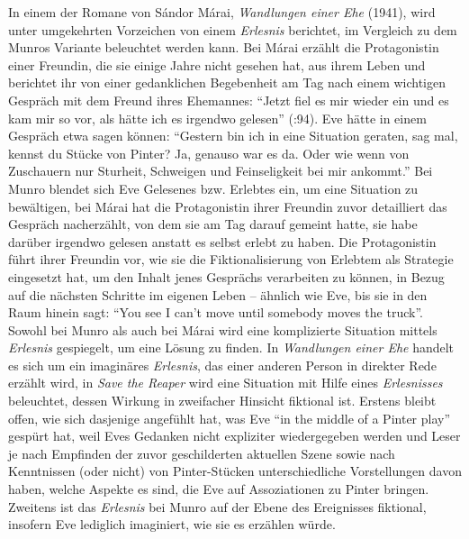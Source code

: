 \documentclass[fontsize=12pt]{scrartcl}
\begin{document}
In einem der Romane von S\'{a}ndor M\'{a}rai, \textit{Wandlungen einer Ehe} (1941), wird unter umgekehrten Vorzeichen von einem \textit{Erlesnis} berichtet, im Vergleich zu dem Munros Variante beleuchtet werden kann. Bei M\'{a}rai erz\"ahlt die Protagonistin\textsuperscript{\tiny *} einer Freun\-din, die sie einige Jahre nicht gesehen hat, aus ihrem Leben und berichtet ihr von einer gedanklichen Begebenheit am Tag nach einem wichtigen Gespr\"ach mit dem Freund ihres Ehemannes: "`Jetzt fiel es mir wieder ein und es kam mir so vor, als h\"atte ich es irgendwo gelesen"' (\cite{Marai1941}:94). Eve h\"atte in einem Gespr\"ach etwa sagen k\"onnen: "`Gestern bin ich in eine Situation geraten, sag mal, kennst du St\"ucke von Pinter? Ja, genauso war es da. Oder wie wenn von Zuschauern nur Sturheit, Schweigen und Feinseligkeit bei mir ankommt."' Bei Munro blendet sich Eve Gelesenes bzw. Erlebtes ein, um eine Si\-tu\-a\-tion zu bew\"altigen, bei M\'{a}rai hat die Protagonistin\textsuperscript{\tiny *} ihrer Freundin zuvor detailliert das Gespr\"ach nacherz\"ahlt, von dem sie am Tag darauf gemeint hatte, sie habe dar\"uber irgendwo gelesen anstatt es \mbox{selbst} erlebt zu haben. Die Protagonistin\textsuperscript{\tiny *} f\"uhrt ihrer Freundin vor, wie sie die Fiktionalisierung von Erlebtem als Strategie eingesetzt hat, um den Inhalt jenes Gespr\"achs verarbei\-ten zu k\"onnen, in Bezug auf die n\"achsten Schritte im eigenen Leben -- \"ahnlich wie Eve, bis sie in den Raum hinein sagt: "`You see I can't move until somebody moves the truck"'. Sowohl bei Munro als auch bei M\'{a}rai wird eine komplizierte Situation mittels \textit{Erlesnis} gespiegelt, um eine L\"osung zu fin\-den. In \textit{Wandlungen einer Ehe} handelt es sich um ein imagin\"ares \textit{Erlesnis}, das einer anderen Person in direkter Rede erz\"ahlt wird, in \textit{Save the Reaper} wird eine Situation mit Hilfe eines \textit{Erlesnisses} beleuchtet, dessen Wirkung in zweifacher Hinsicht fiktional ist. Erstens bleibt offen, wie sich dasjenige ange\-f\"uhlt hat, was Eve "`in the middle of a Pinter play"' gesp\"urt hat, weil Eves Gedanken nicht expliziter wiedergegeben werden und Leser\textsuperscript{\tiny *} je nach Emp\-fin\-den der zuvor geschil\-derten aktuellen Szene sowie nach Kenntnissen (oder nicht) von Pinter-St\"ucken unterschiedliche Vorstellungen davon haben, welche Aspekte es sind, die Eve auf Assoziationen zu Pinter bringen. Zwei\-tens ist das \textit{Erlesnis} bei Munro auf der Ebene des Ereignisses fiktional, insofern Eve lediglich imaginiert, wie sie es erz\"ahlen w\"urde. 
\end{document}
